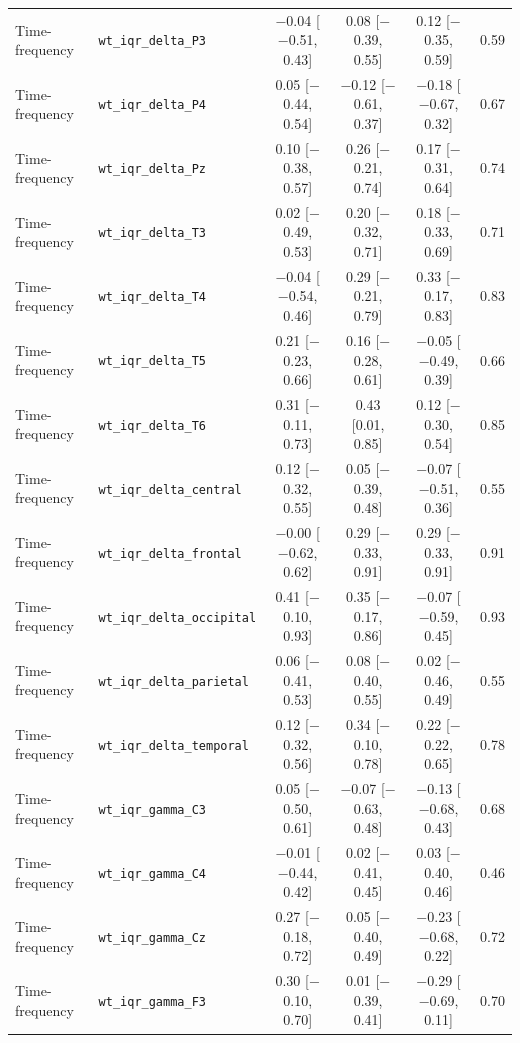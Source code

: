 {\begin{longtable}{llcccc}
Time-frequency & \texttt{wt\_iqr\_delta\_P3} & $-$0.04 [$-$0.51, 0.43] & 0.08 [$-$0.39, 0.55] & 0.12 [$-$0.35, 0.59] & 0.59 \\
Time-frequency & \texttt{wt\_iqr\_delta\_P4} & 0.05 [$-$0.44, 0.54] & $-$0.12 [$-$0.61, 0.37] & $-$0.18 [$-$0.67, 0.32] & 0.67 \\
Time-frequency & \texttt{wt\_iqr\_delta\_Pz} & 0.10 [$-$0.38, 0.57] & 0.26 [$-$0.21, 0.74] & 0.17 [$-$0.31, 0.64] & 0.74 \\
Time-frequency & \texttt{wt\_iqr\_delta\_T3} & 0.02 [$-$0.49, 0.53] & 0.20 [$-$0.32, 0.71] & 0.18 [$-$0.33, 0.69] & 0.71 \\
Time-frequency & \texttt{wt\_iqr\_delta\_T4} & $-$0.04 [$-$0.54, 0.46] & 0.29 [$-$0.21, 0.79] & 0.33 [$-$0.17, 0.83] & 0.83 \\
Time-frequency & \texttt{wt\_iqr\_delta\_T5} & 0.21 [$-$0.23, 0.66] & 0.16 [$-$0.28, 0.61] & $-$0.05 [$-$0.49, 0.39] & 0.66 \\
Time-frequency & \texttt{wt\_iqr\_delta\_T6} & 0.31 [$-$0.11, 0.73] & 0.43 [0.01, 0.85] & 0.12 [$-$0.30, 0.54] & 0.85 \\
Time-frequency & \texttt{wt\_iqr\_delta\_central} & 0.12 [$-$0.32, 0.55] & 0.05 [$-$0.39, 0.48] & $-$0.07 [$-$0.51, 0.36] & 0.55 \\
Time-frequency & \texttt{wt\_iqr\_delta\_frontal} & $-$0.00 [$-$0.62, 0.62] & 0.29 [$-$0.33, 0.91] & 0.29 [$-$0.33, 0.91] & 0.91 \\
Time-frequency & \texttt{wt\_iqr\_delta\_occipital} & 0.41 [$-$0.10, 0.93] & 0.35 [$-$0.17, 0.86] & $-$0.07 [$-$0.59, 0.45] & 0.93 \\
Time-frequency & \texttt{wt\_iqr\_delta\_parietal} & 0.06 [$-$0.41, 0.53] & 0.08 [$-$0.40, 0.55] & 0.02 [$-$0.46, 0.49] & 0.55 \\
Time-frequency & \texttt{wt\_iqr\_delta\_temporal} & 0.12 [$-$0.32, 0.56] & 0.34 [$-$0.10, 0.78] & 0.22 [$-$0.22, 0.65] & 0.78 \\
Time-frequency & \texttt{wt\_iqr\_gamma\_C3} & 0.05 [$-$0.50, 0.61] & $-$0.07 [$-$0.63, 0.48] & $-$0.13 [$-$0.68, 0.43] & 0.68 \\
Time-frequency & \texttt{wt\_iqr\_gamma\_C4} & $-$0.01 [$-$0.44, 0.42] & 0.02 [$-$0.41, 0.45] & 0.03 [$-$0.40, 0.46] & 0.46 \\
Time-frequency & \texttt{wt\_iqr\_gamma\_Cz} & 0.27 [$-$0.18, 0.72] & 0.05 [$-$0.40, 0.49] & $-$0.23 [$-$0.68, 0.22] & 0.72 \\
Time-frequency & \texttt{wt\_iqr\_gamma\_F3} & 0.30 [$-$0.10, 0.70] & 0.01 [$-$0.39, 0.41] & $-$0.29 [$-$0.69, 0.11] & 0.70 \\

\end{longtable}}
